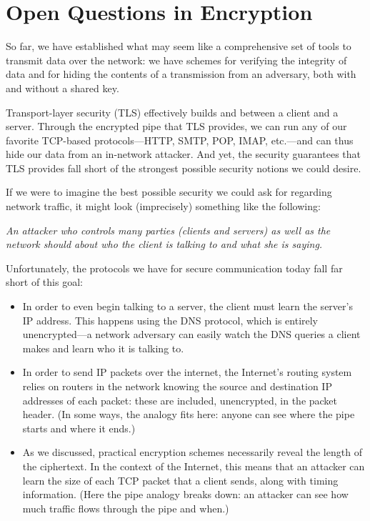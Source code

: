 \chapter{Open Questions in Encryption}

So far, we have established what may seem like
a comprehensive set of tools to transmit data over
the network: we have schemes for verifying the
integrity of data and for hiding the contents of
a transmission from an adversary, both with and
without a shared key.

Transport-layer security (TLS) effectively builds
and  between a client and a server.
Through the encrypted pipe that TLS provides, we can run 
any of our favorite TCP-based
protocols---HTTP, SMTP, POP, IMAP, etc.---and can
thus hide our data from an in-network attacker.
And yet, the security guarantees that TLS provides fall
short of the strongest possible security notions we could
desire.

If we were to imagine the best possible security
we could ask for regarding network traffic, it
might look (imprecisely) something like the
following:

\begin{framed}\noindent
\emph{An attacker who controls many parties (clients and servers) as well as the network should  about who the client is talking to and what she is saying.}
\end{framed}

Unfortunately, the protocols we have for secure communication today
fall far short of this goal:
\begin{itemize}
  \item In order to even begin talking to
    a server, the client must learn the server's IP
    address. This happens using the DNS protocol,
    which is entirely unencrypted---a network
    adversary can easily watch the DNS queries a client
    makes and learn who it is talking to.
  \item In order to send IP packets over the
    internet, the Internet's routing system relies
    on routers in the network knowing the source
    and destination IP addresses of each packet: these are
    included, unencrypted, in the packet header. 
    (In some ways, the  analogy fits
      here: anyone can see where the pipe starts and
      where it ends.)
  \item As we discussed, practical encryption
    schemes necessarily reveal the length of the
    ciphertext. In the context of the Internet,
    this means that an attacker can learn the size
    of each TCP packet that a client sends, along
    with timing information.
    (Here the pipe analogy breaks down: an attacker
    can see how much traffic flows through the pipe
    and when.)
\end{itemize}

